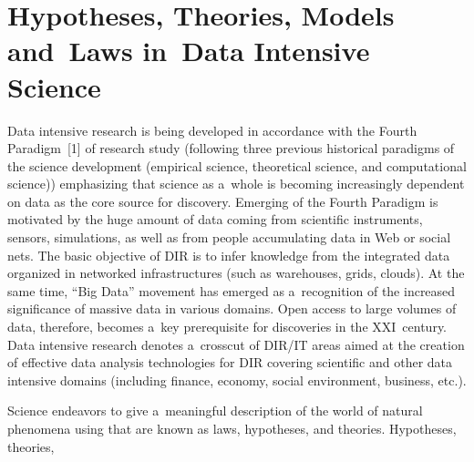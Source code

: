 



      \thispagestyle{myheadings}

      \begin{multicols}{2}

                  \label{st\stat}


\section{Hypotheses, Theories, Models and~Laws in~Data Intensive Science}

  \noindent
  Data intensive research is being developed in accordance with the Fourth
Paradigm~[1] of research study (following three previous historical paradigms of the
science development (empirical science, theoretical science,
and computational science))
emphasizing that science as a~whole is becoming increasingly dependent on data as
the core source for discovery. Emerging of the Fourth Paradigm is motivated by the huge
amount of data coming from scientific instruments, sensors, simulations, as well as
from people accumulating data in Web or social nets. The basic objective of DIR is to
infer knowledge from the integrated data organized in networked infrastructures
(such as warehouses, grids, clouds). At the same time, ``Big Data'' movement has
emerged as a~recognition of the increased significance of massive data in various
domains. Open access to large volumes of data, therefore, becomes a~key prerequisite
for discoveries in the XXI~century. Data intensive research denotes a~crosscut of
DIR/IT areas aimed at the creation of effective data analysis technologies for DIR
covering scientific and other data intensive domains (including finance, economy,
social environment, business, etc.).
{

}

  Science endeavors to give a~meaningful description of the world of natural
phenomena using that are known as laws, hypotheses, and theories. Hypotheses,
theories,\linebreak
\begin{center}  %
\vspace*{-6pt}
\mbox{%
 \epsfxsize=72.481mm
 }

\vspace*{9pt}


\end{center}
\end{multicols}
